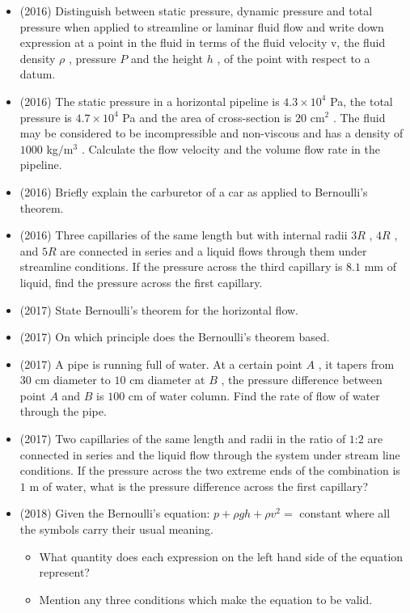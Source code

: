 \documentclass{article}
\begin{document}
\begin{itemize}
\item (2016)  Distinguish between static pressure, dynamic pressure and total pressure when applied to streamline or laminar fluid flow and write down expression at a point in the fluid in terms of the fluid velocity v, the fluid density $ \rho $ , pressure $ P$ and the height $ h$ , of the point with respect to a datum.  
\item (2016)  The static pressure in a horizontal pipeline is $ 4.3 \times 10^{4}$ Pa, the total pressure is $ 4.7 \times 10^{4}$ Pa and the area of cross-section is $ 20 $ cm$ ^{2}$ . The fluid may be considered to be incompressible and non-viscous and has a density of $ 1000$ kg$/$m$ ^{3}$ .  Calculate the flow velocity and the volume flow rate in the pipeline.
\item (2016)  Briefly explain the carburetor of a car as applied to Bernoulli’s theorem.
\item (2016)  Three capillaries of the same length but with internal radii $ 3R$ , $ 4R$ , and $ 5R$ are connected in series and a liquid flows through them under streamline conditions.  If the pressure across the third capillary is $ 8.1$ mm of liquid, find the pressure across the first capillary.
\item (2017)  State Bernoulli's theorem for the horizontal flow. 
\item (2017)  On which principle does the Bernoulli's theorem based. 
\item (2017)  A pipe is running full of water. At a certain point $ A$ , it tapers from $ 30$ cm diameter to $ 10$ cm diameter at $ B$ , the pressure difference between point $ A$ and $ B$ is $ 100$ cm of water column. Find the rate of flow of water through the pipe. 
\item (2017)  Two capillaries of the same length and radii in the ratio of $ 1$:$ 2$ are connected in series and the liquid flow through the system under stream line conditions. If the pressure across the two extreme ends of the combination is  $ 1$ m of water, what is the pressure difference across the first capillary?
\item (2018)  Given the Bernoulli’s equation: $ p+\rho gh+\rho v^{2}=$ constant where all the symbols carry their usual meaning.\begin{itemize}
\item What quantity does each expression on the left hand side of the equation represent? 
\item Mention any three conditions which make the equation to be valid. 
\end{itemize}

\end{itemize}
\end{document}
